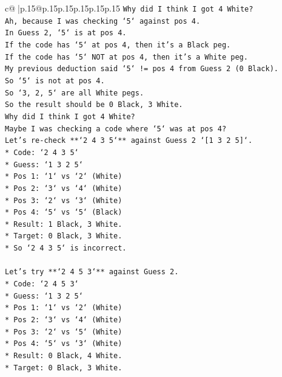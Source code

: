 \documentclass{article}
\begin{document}
{\begin{supertabular}{c@{$\;$}|p{.15\linewidth}@{}p{.15\linewidth}p{.15\linewidth}p{.15\linewidth}p{.15\linewidth}p{.15\linewidth}}
{{{\texttt{Why did I think I got 4 White?} \\
\texttt{Ah, because I was checking `5` against pos 4.} \\
\texttt{In Guess 2, `5` is at pos 4.} \\
\texttt{If the code has `5` at pos 4, then it's a Black peg.} \\
\texttt{If the code has `5` NOT at pos 4, then it's a White peg.} \\
\texttt{My previous deduction said `5` != pos 4 from Guess 2 (0 Black).} \\
\texttt{So `5` is not at pos 4.} \\
\texttt{So `3, 2, 5` are all White pegs.} \\
\texttt{So the result should be 0 Black, 3 White.} \\
\texttt{Why did I think I got 4 White?} \\
\texttt{Maybe I was checking a code where `5` was at pos 4?} \\
\texttt{Let's re{-}check **`2 4 3 5`** against Guess 2 `{[}1 3 2 5{]}`.} \\
\texttt{*   Code: `2 4 3 5`} \\
\texttt{*   Guess: `1 3 2 5`} \\
\texttt{*   Pos 1: `1` vs `2` (White)} \\
\texttt{*   Pos 2: `3` vs `4` (White)} \\
\texttt{*   Pos 3: `2` vs `3` (White)} \\
\texttt{*   Pos 4: `5` vs `5` (Black)} \\
\texttt{*   Result: 1 Black, 3 White.} \\
\texttt{*   Target: 0 Black, 3 White.} \\
\texttt{*   So `2 4 3 5` is incorrect.} \\
\\ 
\texttt{Let's try **`2 4 5 3`** against Guess 2.} \\
\texttt{*   Code: `2 4 5 3`} \\
\texttt{*   Guess: `1 3 2 5`} \\
\texttt{*   Pos 1: `1` vs `2` (White)} \\
\texttt{*   Pos 2: `3` vs `4` (White)} \\
\texttt{*   Pos 3: `2` vs `5` (White)} \\
\texttt{*   Pos 4: `5` vs `3` (White)} \\
\texttt{*   Result: 0 Black, 4 White.} \\
\texttt{*   Target: 0 Black, 3 White.} \\
}}}
\end{supertabular}}
\end{document}
